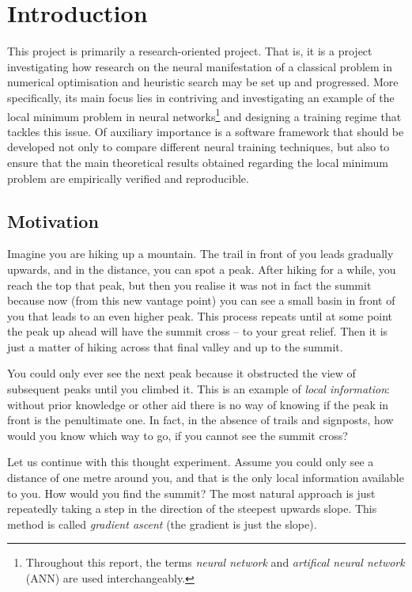 \chapter{Introduction}

This project is primarily a research-oriented project. 
That is, it is a project investigating how research on the neural manifestation of a classical problem in numerical optimisation and heuristic search may be set up and progressed.
More specifically, its main focus lies in contriving and investigating an example of the local minimum problem in neural networks\footnote{Throughout this report, the terms \textit{neural network} and \textit{artifical neural network} (ANN) are used interchangeably.} and designing a training regime that tackles this issue. 
Of auxiliary importance is a software framework that should be developed not only to compare different neural training techniques, but also to ensure that the main theoretical results obtained regarding the local minimum problem are empirically verified and reproducible.

\section{Motivation}
\label{sec:motivation}
Imagine you are hiking up a mountain.
The trail in front of you leads gradually upwards, and in the distance, you can spot a peak.
After hiking for a while, you reach the top that peak, but then you realise it was not in fact the summit because now (from this new vantage point) you can see a small basin in front of you that leads to an even higher peak. 
This process repeats until at some point the peak up ahead will have the summit cross -- to your great relief. 
Then it is just a matter of hiking across that final valley and up to the summit.

You could only ever see the next peak because it obstructed the view of subsequent peaks until you climbed it.
This is an example of \textit{local information}: without prior knowledge or other aid there is no way of knowing if the peak in front is the penultimate one.
In fact, in the absence of trails and signposts, how would you know which way to go, if you cannot see the summit cross?

Let us continue with this thought experiment. 
Assume you could only see a distance of one metre around you, and that is the only local information available to you.
How would you find the summit?
The most natural approach is just repeatedly taking a step in the direction of the steepest upwards slope.
This method is called \textit{gradient ascent} (the gradient is just the slope).


